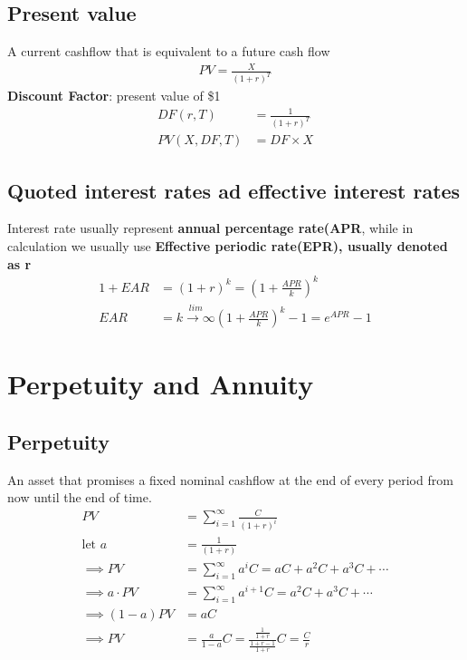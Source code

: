 \documentclass{article}
\theoremstyle{definition}
\theoremstyle{thrm}
\theoremstyle{lma}
\theoremstyle{ppst}
\theoremstyle{crlr}
\begin{document}
\subsection{Present value}
A current cashflow that is equivalent to a future cash flow
\begin{align*}
	PV = \frac{X}{(1+r)^T}
\end{align*}
\textbf{Discount Factor}: present value of \$1
\begin{align*}
	DF(r,T) &= \frac{1}{(1+r)^T}\\
	PV(X,DF,T) &= DF\times X
\end{align*}

\subsection{Quoted interest rates ad effective interest rates}
Interest rate usually represent \textbf{annual percentage rate(APR}, while in  calculation we usually use \textbf{Effective periodic rate(EPR), usually denoted as r}
\begin{align*}
	1+EAR &= (1+r)^k = (1+\frac{APR}{k})^k\\
	EAR &= \stackrel{lim}{k\to \infty}(1+\frac{APR}{k})^k-1 = e^{APR}-1
\end{align*}

\section{Perpetuity and Annuity}
\subsection{Perpetuity}
An asset that promises a fixed nominal cashflow at the end of every period from now until the end of time.
\begin{align*}
	PV &= \sum_{i=1}^\infty \frac{C}{(1+r)^i}\\
	\text{let } a &= \frac{1}{(1+r)}\\
	\implies PV &= \sum_{i=1}^\infty a^iC = aC + a^2C + a^3 C +\cdots \\
	\implies a\cdot PV &= \sum_{i=1}^\infty a^{i+1}C = a^2C + a^3C +\cdots\\
	\implies (1-a)PV &= aC\\
	\implies PV &= \frac{a}{1-a}C = \frac{\frac{1}{1+r}}{\frac{1+r-1}{1+r}}C = \frac{C}{r}
\end{align*} 
\end{document}
